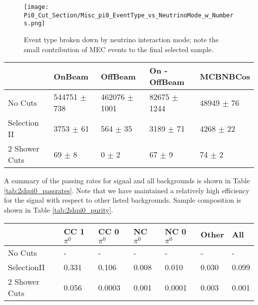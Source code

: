 \begin{figure}[h!]
\centering
\texttt{[image: Pi0\_Cut\_Section/Misc\_pi0\_EventType\_vs\_NeutrinoMode\_w\_Numbers.png]}
\caption{ Event type broken down by neutrino interaction mode; note the small contribution of MEC events to the final selected sample. }
\label{fig:physics_pi0_inttype}
\end{figure}

\begin{table*} 
 \centering
 \begin{tabular}{| l | l | l | l | l |}
  \hline
   & OnBeam & OffBeam & On - OffBeam & MCBNBCos \\ [0.1ex] \hline
No Cuts & 544751 $\pm$ 738 & 462076 $\pm$ 1001 & 82675 $\pm$ 1244 & 48949 $\pm$ 76 \\ 
Selection II & 3753 $\pm$ 61 & 564 $\pm$ 35 & 3189 $\pm$ 71 & 4268 $\pm$ 22 \\ 
2 Shower Cuts & 69 $\pm$ 8 & 0 $\pm$ 2 & 67 $\pm$ 9 & 74 $\pm$ 2  \\ \hline
\end{tabular}
 \end{table*}

\par A summary of the passing rates for signal and all backgrounds is shown in Table \ref{tab:2shpi0_passrates}.  Note that we have maintained a relatively high efficiency for the signal with respect to other listed backgrounds. Sample composition is shown in Table \ref{tab:2shpi0_purity}. 

\begin{table*}
\centering
{}
 \begin{tabular}{| l | l | l |l|l|l|l|}
 \hline
 & CC 1$\pi^0$ & CC 0$\pi^0$ & NC $\pi^0$ & NC 0$\pi^0$ & Other & All \\ [0.1ex] \hline
No Cuts & - & - & - & - & - & -\\
SelectionII & 0.331 & 0.106 & 0.008 & 0.010 & 0.030 & 0.099 \\ 
2 Shower Cuts & 0.056 & 0.0003 & 0.001 & 0.0001 & 0.003 & 0.001 \\ \hline
\end{tabular}
\end{table*}

